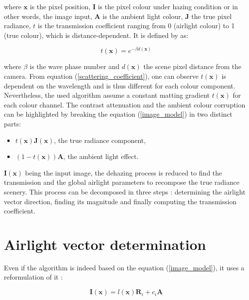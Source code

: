 \documentclass[conference]{IEEEtran}
\begin{document}
where $\mathbf{x}$ is the pixel position, $\mathbf{I}$ is the pixel colour under hazing condition or in other words, the image input, $\mathbf{A}$ is the ambient light colour,
$\mathbf{J}$ the true pixel radiance, $t$ is the transmission coefficient ranging from 0 (airlight colour)
to 1 (true colour), which is distance-dependent. It is defined by \cite{dehaze} as:

\begin{equation}
\label{scattering_coefficient}
t(\mathbf{x}) = e^{-\beta d(\mathbf{x})}
\end{equation}

where $\beta$ is the wave phase number and $d(\textbf{x})$ the scene pixel distance from the camera.  From equation (\ref{scattering_coefficient}),
one can observe $t(\mathbf{x})$ is dependent on the wavelength and is thus different for each colour component.  Nevertheless, the used algorithm assume a constant matting gradient $t(\mathbf{x})$ for each colour channel.
The contrast attenuation and the ambient colour corruption can be highlighted by breaking the equation (\ref{image_model}) in two distinct parts: 
\begin{itemize}
    \item $t(\mathbf{x}) \mathbf{J}(\mathbf{x})$, the true radiance component,
    \item $(1-t(\mathbf{x})) \mathbf{A}$, the ambient light effect.
\end{itemize}
$\mathbf{I}(\mathbf{x})$ being the input image, the dehazing process is reduced to find the transmission and the global airlight parameters to recompose
the true radiance scenery.  This process can be decomposed in three steps : determining the airlight vector direction, finding its magnitude and finally computing the transmission coefficient.

\section{Airlight vector determination}  

Even if the algorithm is indeed based on the equation (\ref{image_model}), it uses a reformulation of it \cite{airlight}:

\begin{equation}
\label{shading_coefficient}
\mathbf{I}(\mathbf{x}) = l(\mathbf{x}) \mathbf{R}_i + c_i \mathbf{A}
\end{equation}
\end{document}
